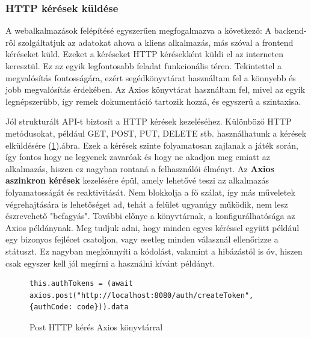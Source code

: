 \documentclass[a4paper,twoside]{article}
\begin{document}
\subsubsection{HTTP kérések küldése}
A webalkalmazások felépítésé egyszerűen megfogalmazva a következő: A backend-ről szolgáltatjuk az adatokat ahova a kliens alkalmazás, más szóval a frontend kéréseket küld. Ezeket a kéréseket HTTP kérésekként küldi el az interneten keresztül. Ez az egyik legfontosabb feladat funkcionális téren. Tekintettel a megvalósítás fontosságára, ezért segédkönyvtárat használtam fel a könnyebb és jobb megvalósítás érdekében. Az Axios\cite{axiosLibrary} könyvtárat használtam fel, mivel az egyik legnépszerűbb, így remek dokumentáció tartozik hozzá, és egyszerű a szintaxisa. 

Jól strukturált API-t biztosít a HTTP kérések kezeléséhez. Különböző HTTP metódusokat, például GET, POST,
PUT, DELETE stb. használhatunk a kérések elküldésére (\ref{axios}).ábra. Ezek a kérések szinte folyamatosan zajlanak a játék során, így fontos hogy ne legyenek zavaróak és hogy ne akadjon meg emiatt az alkalmazás, hiszen ez nagyban rontaná a felhasználói élményt. Az \textbf{Axios aszinkron kérések} kezelésére épül, amely
lehetővé teszi az alkalmazás folyamatosságát és reaktivitását. Nem blokkolja a fő
szálat, így más műveletek végrehajtására is lehetőséget ad, tehát a felület ugyanúgy működik, nem lesz észrevehető "befagyás".
További előnye a könyvtárnak, a konfigurálhatósága az Axios példánynak. Meg tudjuk adni, hogy minden egyes kéréssel együtt például egy bizonyos fejlécet csatoljon, vagy esetleg minden válasznál ellenőrizze a státuszt. Ez nagyban megkönnyíti a kódolást, valamint a hibázástól is óv, hiszen csak egyszer kell jól megírni a használni kívánt példányt. 
\begin{figure}
	\caption{Post HTTP kérés Axios könyvtárral}
	
		\begin{minipage}{\textwidth}
			\begin{lstlisting}[style=javascriptStyle]
					this.authTokens = (await axios.post("http://localhost:8080/auth/createToken", {authCode: code})).data
					\end{lstlisting}
				\end{minipage}
	
\label{axios}
\end{figure}
\end{document}

